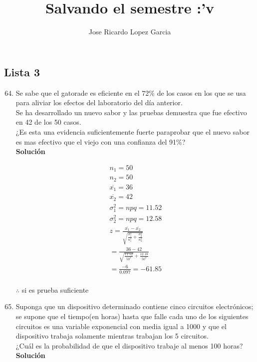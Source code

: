 \documentclass[11pt,a4paper]{article}
\author{Jose Ricardo Lopez Garcia}
\title{Salvando el semestre :'v}
\begin{document}
\maketitle

\subsection{Lista 3}

\begin{enumerate}
\setcounter{enumi}{63}
 \item Se sabe que el gatorade es eficiente en el 72\% de los casos en los que se usa para aliviar los efectos del laboratorio del día anterior. \\
 Se ha desarrollado un nuevo sabor y las pruebas demuestra que fue efectivo en 42 de los 50 casos.\\
¿Es esta una evidencia suficientemente fuerte paraprobar que el nuevo sabor es mas efectivo que el viejo con una confianza del 91\%?
	\\\textbf{Solución}
	
	\begin{gather*}	 
	n_{1} = 50\\
	n_{2} = 50\\
	\overline{x_{1}} = 36\\
	\overline{x_{2}} = 42\\	
	\sigma_{1}^{2} = npq =11.52\\
	\sigma_{2}^{2} = npq =12.58\\
	z = \frac{\overline{x_{1}} - \overline{x_{2}}}{\sqrt{\frac{\sigma_{1}^{2}}{n_{1}^{2}} + \frac{\sigma_{2}^{2}}{n_{2}^{2}}}}\\= \frac{36-42}{\sqrt{\frac{11.52}{50^{2}}}+\frac{12.18}{50^{2}}}\\
	=\frac{-6}{0.097} = -61.85\\
	\end{gather*}
	\begin{center}
	$\therefore$ si es prueba suficiente
	\end{center}
\item Suponga que un dispositivo determinado contiene cinco circuitos electrónicos; se supone que el tiempo(en horas) hasta que falle cada uno de los siguientes circuitos es una variable exponencial con media igual a 1000 y que el dispositivo trabaja solamente mientras trabajan los 5 circuitos.\\
¿Cuál es la probabilidad de que el dispositivo trabaje al menos 100 horas?
	\\\textbf{Solución}
	

\end{enumerate}
\end{document}
